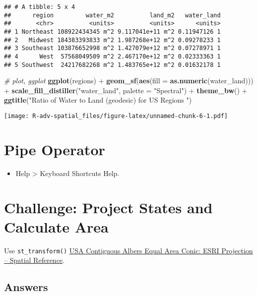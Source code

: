 \documentclass[]{book}
\newenvironment{Shaded}{\begin{snugshade}}{\end{snugshade}}
\newcommand{\KeywordTok}[1]{\textcolor[rgb]{0.13,0.29,0.53}{\textbf{{#1}}}}
\newcommand{\DataTypeTok}[1]{\textcolor[rgb]{0.13,0.29,0.53}{{#1}}}
\newcommand{\StringTok}[1]{\textcolor[rgb]{0.31,0.60,0.02}{{#1}}}
\newcommand{\CommentTok}[1]{\textcolor[rgb]{0.56,0.35,0.01}{\textit{{#1}}}}
\newcommand{\NormalTok}[1]{{#1}}
\providecommand{\tightlist}{%
  \setlength{\itemsep}{0pt}\setlength{\parskip}{0pt}}
\begin{document}
\begin{verbatim}
## # A tibble: 5 x 4
##      region         water_m2          land_m2   water_land
##       <chr>          <units>          <units>      <units>
## 1 Northeast 108922434345 m^2 9.117041e+11 m^2 0.11947126 1
## 2   Midwest 184383393833 m^2 1.987268e+12 m^2 0.09278233 1
## 3 Southeast 103876652998 m^2 1.427079e+12 m^2 0.07278971 1
## 4      West  57568049509 m^2 2.467170e+12 m^2 0.02333363 1
## 5 Southwest  24217682268 m^2 1.483765e+12 m^2 0.01632178 1
\end{verbatim}

\begin{Shaded}
\begin{Highlighting}[]
\CommentTok{# plot, ggplot}
\KeywordTok{ggplot}\NormalTok{(regions) +}
\StringTok{  }\KeywordTok{geom_sf}\NormalTok{(}\KeywordTok{aes}\NormalTok{(}\DataTypeTok{fill =} \KeywordTok{as.numeric}\NormalTok{(water_land))) +}
\StringTok{  }\KeywordTok{scale_fill_distiller}\NormalTok{(}\StringTok{"water_land"}\NormalTok{, }\DataTypeTok{palette =} \StringTok{"Spectral"}\NormalTok{) +}
\StringTok{  }\KeywordTok{theme_bw}\NormalTok{() +}
\StringTok{  }\KeywordTok{ggtitle}\NormalTok{(}\StringTok{"Ratio of Water to Land (geodesic) for US Regions "}\NormalTok{)}
\end{Highlighting}
\end{Shaded}

\texttt{[image: R-adv-spatial\_files/figure-latex/unnamed-chunk-6-1.pdf]}

\section{Pipe Operator}\label{pipe-operator}

\begin{itemize}
\tightlist
\item
  Help \textgreater{} Keyboard Shortcuts Help.
\end{itemize}

\section{Challenge: Project States and Calculate
Area}\label{challenge-project-states-and-calculate-area}

Use \texttt{st\_transform()}
\href{http://spatialreference.org/ref/esri/usa-contiguous-albers-equal-area-conic/}{USA
Contiguous Albers Equal Area Conic: ESRI Projection -- Spatial
Reference}.

\subsection{Answers}\label{answers-1}
\end{document}
